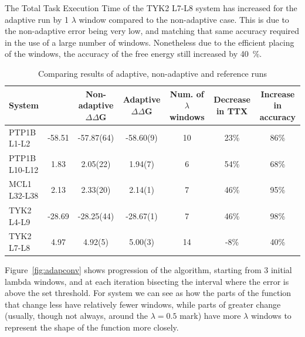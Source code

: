 The Total Task Execution Time of the TYK2 L7-L8 system has increased for the
adaptive run by 1 $\lambda$ window compared to the non-adaptive case. This is
due to the non-adaptive error being very low, and matching that same accuracy
required in the use of a large number of windows. Nonetheless due to the
efficient placing of the windows, the accuracy of the free energy still
increased by \SI{40}{\percent}.

\begin{table}
  \caption{Comparing results of adaptive, non-adaptive and reference runs}
  \label{tab:adapquad}
  \begin{tabular}{lSSSSS[table-format=5.1]S[table-format=5.1]}
    \toprule
    {System}                               & 
    {}  &
    {Non-adaptive $\Delta \Delta$G}        &
    {Adaptive $\Delta \Delta$G}            &
    {Num. of $\lambda$ windows}            &
    {Decrease in TTX}       &
    {Increase in accuracy}                 \\
    \midrule
    {PTP1B L1-L2}   & 
    -58.51 & 
    -57.87(64) & 
    -58.60(9) & 
    10 & 
    23\si{\percent} & 
    86\si{\percent} \\
    {PTP1B L10-L12} & 
    1.83   & 
    2.05(22) & 
    1.94(7)  & 
    6  & 
    54\si{\percent} &
    68\si{\percent} \\
    {MCL1  L32-L38} & 
    2.13   & 
    2.33(20) & 
    2.14(1)      & 
    7  & 
    46\si{\percent} & 
    95\si{\percent} \\
    {TYK2  L4-L9}   &
    -28.69 & 
    -28.25(44) & 
    -28.67(1)  & 
    7  & 
    46\si{\percent} & 
    98\si{\percent} \\
    {TYK2  L7-L8}   & 
    4.97   & 
    4.92(5) & 
    5.00(3)      & 
    14 &  
    -8\si{\percent} & 
    40\si{\percent} \\
    \bottomrule 
    
  \end{tabular}
\end{table}

Figure~\ref{fig:adapconv} shows progression of the algorithm, starting from 3
initial lambda windows, and at each iteration bisecting the interval where
the error is above the set threshold. For system  we can see as how the
parts of the function that change less have relatively fewer windows, while
parts of greater change (usually, though not always, around the $\lambda=0.5$
mark) have more $\lambda$ windows to represent the shape of the function more
closely.


